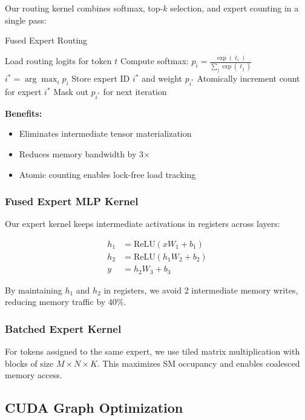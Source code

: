 \documentclass{article}
\begin{document}
Our routing kernel combines softmax, top-$k$ selection, and expert counting in a single pass:

\begin{algorithm}
\caption{Fused Expert Routing}
\begin{algorithmic}[1]
\STATE Load routing logits for token $t$
\STATE Compute softmax: $p_i = \frac{\exp(\ell_i)}{\sum_j \exp(\ell_j)}$
    \STATE $i^* = \arg\max_i p_i$
    \STATE Store expert ID $i^*$ and weight $p_{i^*}$
    \STATE Atomically increment count for expert $i^*$
    \STATE Mask out $p_{i^*}$ for next iteration
\ENDFOR
\end{algorithmic}
\end{algorithm}

\textbf{Benefits:}
\begin{itemize}
    \item Eliminates intermediate tensor materialization
    \item Reduces memory bandwidth by 3$\times$
    \item Atomic counting enables lock-free load tracking
\end{itemize}

\subsubsection{Fused Expert MLP Kernel}

Our expert kernel keeps intermediate activations in registers across layers:

\begin{align}
h_1 &= \text{ReLU}(x W_1 + b_1) \\
h_2 &= \text{ReLU}(h_1 W_2 + b_2) \\
y &= h_2 W_3 + b_3
\end{align}

By maintaining $h_1$ and $h_2$ in registers, we avoid 2 intermediate memory writes, reducing memory traffic by 40\%.

\subsubsection{Batched Expert Kernel}

For tokens assigned to the same expert, we use tiled matrix multiplication with blocks of size $M \times N \times K$. This maximizes SM occupancy and enables coalesced memory access.

\subsection{CUDA Graph Optimization}
\end{document}
